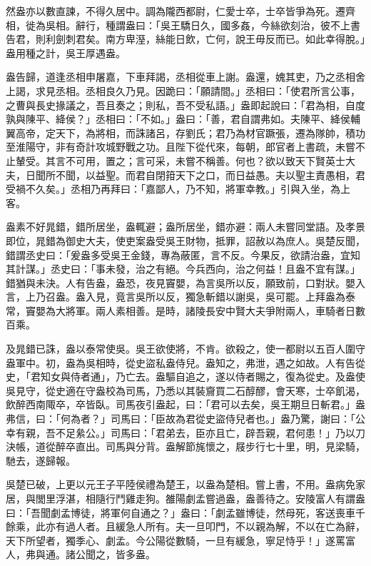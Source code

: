 \begin{pinyinscope}
然盎亦以數直諫，不得久居中。調為隴西都尉，仁愛士卒，士卒皆爭為死。遷齊相，徙為吳相。辭行，種謂盎曰：「吳王驕日久，國多姦，今絲欲刻治，彼不上書告君，則利劍刺君矣。南方卑溼，絲能日飲，亡何，說王毋反而已。如此幸得脫。」盎用種之計，吳王厚遇盎。

盎告歸，道逢丞相申屠嘉，下車拜謁，丞相從車上謝。盎還，媿其吏，乃之丞相舍上謁，求見丞相。丞相良久乃見。因跪曰：「願請間。」丞相曰：「使君所言公事，之曹與長史掾議之，吾且奏之；則私，吾不受私語。」盎即起說曰：「君為相，自度孰與陳平、絳侯？」丞相曰：「不如。」盎曰：「善，君自謂弗如。夫陳平、絳侯輔翼高帝，定天下，為將相，而誅諸呂，存劉氏；君乃為材官蹶張，遷為隊帥，積功至淮陽守，非有奇計攻城野戰之功。且陛下從代來，每朝，郎官者上書疏，未嘗不止輦受。其言不可用，置之；言可采，未嘗不稱善。何也？欲以致天下賢英士大夫，日聞所不聞，以益聖。而君自閉箝天下之口，而日益愚。夫以聖主責愚相，君受禍不久矣。」丞相乃再拜曰：「嘉鄙人，乃不知，將軍幸教。」引與入坐，為上客。

盎素不好晁錯，錯所居坐，盎輒避；盎所居坐，錯亦避：兩人未嘗同堂語。及孝景即位，晁錯為御史大夫，使吏案盎受吳王財物，抵罪，詔赦以為庶人。吳楚反聞，錯謂丞史曰：「爰盎多受吳王金錢，專為蔽匿，言不反。今果反，欲請治盎，宜知其計謀。」丞史曰：「事未發，治之有絕。今兵西向，治之何益！且盎不宜有謀。」錯猶與未決。人有告盎，盎恐，夜見竇嬰，為言吳所以反，願致前，口對狀。嬰入言，上乃召盎。盎入見，竟言吳所以反，獨急斬錯以謝吳，吳可罷。上拜盎為泰常，竇嬰為大將軍。兩人素相善。是時，諸陵長安中賢大夫爭附兩人，車騎者日數百乘。

及晁錯已誅，盎以泰常使吳。吳王欲使將，不肯。欲殺之，使一都尉以五百人圍守盎軍中。初，盎為吳相時，從史盜私盎侍兒。盎知之，弗泄，遇之如故。人有告從史，「君知女與侍者通」，乃亡去。盎驅自追之，遂以侍者賜之，復為從史。及盎使吳見守，從史適在守盎校為司馬，乃悉以其裝齎買二石醇醪，會天寒，士卒飢渴，飲醉西南陬卒，卒皆臥。司馬夜引盎起，曰：「君可以去矣，吳王期旦日斬君。」盎弗信，曰：「何為者？」司馬曰：「臣故為君從史盜侍兒者也。」盎乃驚，謝曰：「公幸有親，吾不足絫公。」司馬曰：「君弟去，臣亦且亡，辟吾親，君何患！」乃以刀決帳，道從醉卒直出。司馬與分背。盎解節旄懷之，屐步行七十里，明，見梁騎，馳去，遂歸報。

吳楚已破，上更以元王子平陸侯禮為楚王，以盎為楚相。嘗上書，不用。盎病免家居，與閭里浮湛，相隨行鬥雞走狗。雒陽劇孟嘗過盎，盎善待之。安陵富人有謂盎曰：「吾聞劇孟博徒，將軍何自通之？」盎曰：「劇孟雖博徒，然母死，客送喪車千餘乘，此亦有過人者。且緩急人所有。夫一旦叩門，不以親為解，不以在亡為辭，天下所望者，獨季心、劇孟。今公陽從數騎，一旦有緩急，寧足恃乎！」遂罵富人，弗與通。諸公聞之，皆多盎。


\end{pinyinscope}
